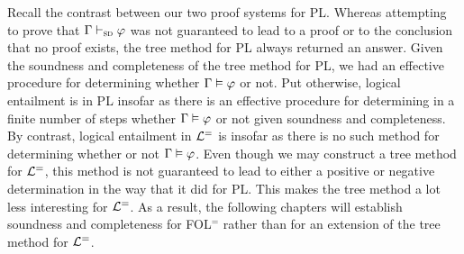 Recall the contrast between our two proof systems for PL.
Whereas attempting to prove that $\Gamma \vdash_{\textsc{sd}} \varphi$ was not guaranteed to lead to a proof or to the conclusion that no proof exists, the tree method for PL always returned an answer. 
Given the soundness and completeness of the tree method for PL, we had an effective procedure for determining whether $\Gamma\vDash\varphi$ or not. 
Put otherwise, logical entailment is  in PL insofar as there is an effective procedure for determining in a finite number of steps whether $\Gamma \vDash \varphi$ or not given soundness and completeness.
By contrast, logical entailment in $\mathcal{L}^{=}$ is  insofar as there is no such method for determining whether or not $\Gamma \vDash \varphi$.
Even though we may construct a tree method for $\mathcal{L}^{=}$, this method is not guaranteed to lead to either a positive or negative determination in the way that it did for PL.
This makes the tree method a lot less interesting for $\mathcal{L}^{=}$.
As a result, the following chapters will establish soundness and completeness for FOL$^=$ rather than for an extension of the tree method for $\mathcal{L}^{=}$.



\iffalse

\practiceproblems


